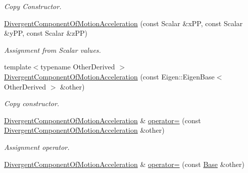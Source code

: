 \begin{DoxyCompactItemize}
\begin{DoxyCompactList}\small\item\em Copy Constructor. \end{DoxyCompactList}\item 
\hyperlink{classow__core_1_1DivergentComponentOfMotionAcceleration_a2ed6660630754bd12782723bd4bb446b}{Divergent\+Component\+Of\+Motion\+Acceleration} (const Scalar \&x\+PP, const Scalar \&y\+PP, const Scalar \&z\+PP)\hypertarget{classow__core_1_1DivergentComponentOfMotionAcceleration_a2ed6660630754bd12782723bd4bb446b}{}\label{classow__core_1_1DivergentComponentOfMotionAcceleration_a2ed6660630754bd12782723bd4bb446b}

\begin{DoxyCompactList}\small\item\em Assignment from Scalar values. \end{DoxyCompactList}\item 
{\footnotesize template$<$typename Other\+Derived $>$ }\\\hyperlink{classow__core_1_1DivergentComponentOfMotionAcceleration_ad9bd53859632467471aa902af6db053f}{Divergent\+Component\+Of\+Motion\+Acceleration} (const Eigen\+::\+Eigen\+Base$<$ Other\+Derived $>$ \&other)
\begin{DoxyCompactList}\small\item\em Copy constructor. \end{DoxyCompactList}\item 
\hyperlink{classow__core_1_1DivergentComponentOfMotionAcceleration}{Divergent\+Component\+Of\+Motion\+Acceleration} \& \hyperlink{classow__core_1_1DivergentComponentOfMotionAcceleration_abc3868dcca7086309a72fcd83f9596f6}{operator=} (const \hyperlink{classow__core_1_1DivergentComponentOfMotionAcceleration}{Divergent\+Component\+Of\+Motion\+Acceleration} \&other)\hypertarget{classow__core_1_1DivergentComponentOfMotionAcceleration_abc3868dcca7086309a72fcd83f9596f6}{}\label{classow__core_1_1DivergentComponentOfMotionAcceleration_abc3868dcca7086309a72fcd83f9596f6}

\begin{DoxyCompactList}\small\item\em Assignment operator. \end{DoxyCompactList}\item 
\hyperlink{classow__core_1_1DivergentComponentOfMotionAcceleration}{Divergent\+Component\+Of\+Motion\+Acceleration} \& \hyperlink{classow__core_1_1DivergentComponentOfMotionAcceleration_a9da77cce9143db2c07ef2a3c235671f0}{operator=} (const \hyperlink{classow__core_1_1LinearAcceleration}{Base} \&other)\hypertarget{classow__core_1_1DivergentComponentOfMotionAcceleration_a9da77cce9143db2c07ef2a3c235671f0}{}\label{classow__core_1_1DivergentComponentOfMotionAcceleration_a9da77cce9143db2c07ef2a3c235671f0}


\end{DoxyCompactItemize}
